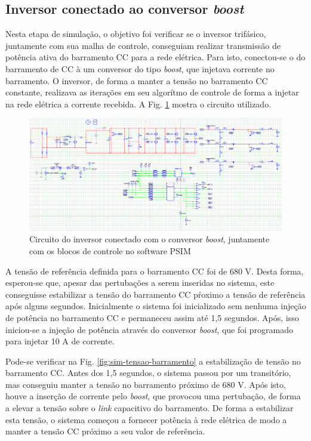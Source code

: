 \subsection{Inversor conectado ao conversor \textit{boost}}

Nesta etapa de simulação, o objetivo foi verificar se o inversor trifásico, juntamente com sua malha de controle, conseguiam realizar transmissão de potência ativa do barramento CC para a rede elétrica. 
Para isto, conectou-se o do barramento de CC à um conversor do tipo \textit{boost}, que injetava corrente no barramento.
O inversor, de forma a manter a tensão no barramento CC constante, realizava as iterações em seu algorítmo de controle de forma a injetar na rede elétrica a corrente recebida.
A Fig. \ref{fig:sim-circuito-inversor-boost} mostra o circuito utilizado.

\begin{figure}[!hbt]
	\begin{center}
    \includegraphics[width=\textwidth]{figuras/sim_figures/inversor_e_boost/esquematico.PNG}\centering
    \caption{Circuito do inversor conectado com o conversor \textit{boost}, juntamente com os blocos de controle no software PSIM}
    \label{fig:sim-circuito-inversor-boost}
    \end{center}
\end{figure}

A tensão de referência definida para o barramento CC foi de 680 V. Desta forma, esperou-se que, apesar das pertubações a serem inseridas no sistema, este conseguisse estabilizar a tensão do barramento CC pŕoximo a tensão de referência após alguns segundos.
Inicialmente o sistema foi inicializado sem nenhuma injeção de potência no barramento CC e permaneceu assim até 1,5 segundos. Após, isso iniciou-se a injeção de potência através do conversor \textit{boost}, que foi programado para injetar 10 A de corrente.

Pode-se verificar na Fig. \ref{fig:sim-tensao-barramento} a estabilização de tensão no barramento CC. 
Antes dos 1,5 segundos, o sistema passou por um transitório, mas conseguiu manter a tensão no barramento próximo de 680 V. 
Após isto, houve a inserção de corrente pelo \textit{boost}, que provocou uma pertubação, de forma a elevar a tensão sobre o \textit{link} capacitivo do barramento.
De forma a estabilizar esta tensão, o sistema começou a fornecer potência à rede elétrica de modo a manter a tensão CC próximo a seu valor de referência.

